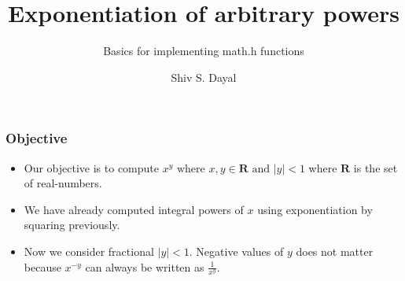 \documentclass[aspectratio=1610]{beamer}
\begin{document}
\begin{frame}
\title{Exponentiation of arbitrary powers}
\subtitle{Basics for implementing math.h functions}
\author{Shiv S. Dayal}
\titlepage
\end{frame}

\begin{frame}
\frametitle{Objective}
\begin{itemize}
\item Our objective is to compute $x^y \text{ where } x, y \in \mathbf{R}
\text{ and } |y|<1$
where $\mathbf{R}$ is the set of real-numbers.
\item We have already computed integral powers of $x$ using exponentiation
by squaring previously.
\item Now we consider fractional $|y|<1$. Negative values of $y$ does not
matter because $x^{-y}$ can always be written as $\frac{1}{x^y}$.
\end{itemize}
\end{frame}
\end{document}
